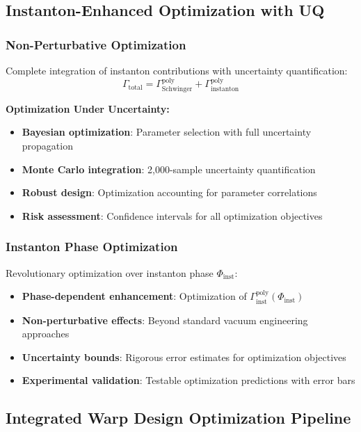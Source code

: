 \documentclass[11pt]{article}
\begin{document}
\subsection{Instanton-Enhanced Optimization with UQ}

\subsubsection{Non-Perturbative Optimization}
Complete integration of instanton contributions with uncertainty quantification:
\begin{equation}
\Gamma_{\text{total}} = \Gamma_{\text{Schwinger}}^{\text{poly}} + \Gamma_{\text{instanton}}^{\text{poly}}
\end{equation}

\textbf{Optimization Under Uncertainty:}
\begin{itemize}
    \item \textbf{Bayesian optimization}: Parameter selection with full uncertainty propagation
    \item \textbf{Monte Carlo integration}: 2,000-sample uncertainty quantification
    \item \textbf{Robust design}: Optimization accounting for parameter correlations
    \item \textbf{Risk assessment}: Confidence intervals for all optimization objectives
\end{itemize}

\subsubsection{Instanton Phase Optimization}
Revolutionary optimization over instanton phase $\Phi_{\text{inst}}$:
\begin{itemize}
    \item \textbf{Phase-dependent enhancement}: Optimization of $\Gamma_{\text{inst}}^{\text{poly}}(\Phi_{\text{inst}})$
    \item \textbf{Non-perturbative effects}: Beyond standard vacuum engineering approaches
    \item \textbf{Uncertainty bounds}: Rigorous error estimates for optimization objectives
    \item \textbf{Experimental validation}: Testable optimization predictions with error bars
\end{itemize}

\subsection{Integrated Warp Design Optimization Pipeline}
\end{document}
